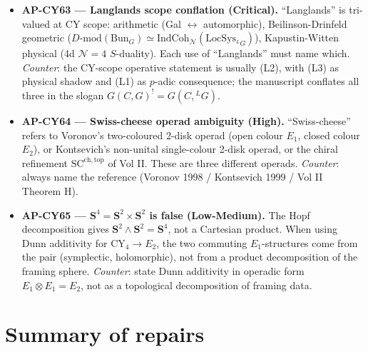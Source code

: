 \documentclass[11pt]{amsart}
\theoremstyle{definition}
\providecommand{\DMod}{D\text{-}\mathrm{mod}}
\providecommand{\Eone}{E_1}
\providecommand{\Etwo}{E_2}
\providecommand{\bS}{\mathbf{S}}
\providecommand{\Bun}{\mathrm{Bun}}
\providecommand{\LG}{{}^L G}
\begin{document}
\begin{itemize}
 \item \textbf{AP-CY63 --- Langlands scope conflation (Critical).}
   ``Langlands'' is tri-valued at CY scope: arithmetic (Gal $\leftrightarrow$
   automorphic), Beilinson-Drinfeld geometric ($\DMod(\Bun_G) \simeq
   \mathrm{IndCoh}_\mathcal{N}(\mathrm{LocSys}_{\LG})$), Kapustin-Witten physical
   (4d $\mathcal{N}=4$ $S$-duality). Each use of ``Langlands'' must
   name which. \emph{Counter}: the CY-scope operative statement is
   usually (L2), with (L3) as physical shadow and (L1) as $p$-adic
   consequence; the manuscript conflates all three in the slogan
   $G(C,G)^! = G(C,\LG)$.

 \item \textbf{AP-CY64 --- Swiss-cheese operad ambiguity (High).}
   ``Swiss-cheese'' refers to Voronov's two-coloured 2-disk operad
   (open colour $\Eone$, closed colour $\Etwo$), or Kontsevich's
   non-unital single-colour 2-disk operad, or the chiral refinement
   $\mathrm{SC}^{\mathrm{ch,top}}$ of Vol II. These are three different
   operads. \emph{Counter}: always name the reference (Voronov 1998 /
   Kontsevich 1999 / Vol II Theorem H).

 \item \textbf{AP-CY65 --- $\bS^4 = \bS^2 \times \bS^2$ is false
   (Low-Medium).} The Hopf decomposition gives $\bS^2 \wedge \bS^2 = \bS^4$,
   not a Cartesian product. When using Dunn additivity for CY$_4 \to \Etwo$,
   the two commuting $\Eone$-structures come from the pair
   (symplectic, holomorphic), not from a product decomposition of the
   framing sphere. \emph{Counter}: state Dunn additivity in operadic
   form $\Eone \otimes \Eone = \Etwo$, not as a topological
   decomposition of framing data.
\end{itemize}

\section*{Summary of repairs}
\end{document}
